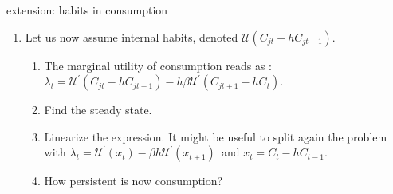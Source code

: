 \documentclass[a4paper,12pt]{article}%
\begin{document}
\begin{myexercise}{extension: habits in consumption}
\begin{enumerate}
\begin{enumerate}
\item Linearize the expression. It might be useful to split the problem with
$\lambda_{t}=\mathcal{U}^{\prime}\left(  x_{t}\right)  $\ and $x_{t}%
=C_{t}-hC_{t-1}$ because the linearization trick cannot be applied for highly
non-linear problems.

\item How persistent is now consumption?
\end{enumerate}

\item Let us now assume internal habits, denoted $\mathcal{U}\left(
C_{jt}-hC_{jt-1}\right)  $.

\begin{enumerate}
\item The marginal utility of consumption reads as : $\lambda_{t}%
=\mathcal{U}^{\prime}\left(  C_{jt}-hC_{jt-1}\right)  -h\beta\mathcal{U}%
^{\prime}\left(  C_{jt+1}-hC_{t}\right)  $.

\item Find the steady state.

\item Linearize the expression. It might be useful to split again the problem
with $\lambda_{t}=\mathcal{U}^{\prime}\left(  x_{t}\right)  -\beta
h\mathcal{U}^{\prime}\left(  x_{t+1}\right)  $\ and $x_{t}=C_{t}-hC_{t-1}$.

\item How persistent is now consumption?
\end{enumerate}
\end{enumerate}

%

\end{myexercise}%


\newpage%
\end{document}
